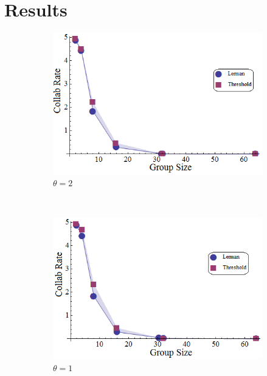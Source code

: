 \documentclass[defaultstyle,12pt]{proposal}
\begin{document}
\section{Results}
\begin{figure}[!htb]
\begin{subfigure}{0.33\textwidth}
\centering\includegraphics[width=1.0\textwidth]{../assets/LermanCollabCompare3.png}
\centering\caption{$\theta=2$}\label{fig:lercol3}
\end{subfigure}~
\begin{subfigure}{0.33\textwidth}
\centering\includegraphics[width=1.0\textwidth]{../assets/LermanCollabCompare2.png}
\centering\caption{$\theta=1$}\label{fig:lercol2}
\end{subfigure}~
\begin{subfigure}{0.33\textwidth}

\end{subfigure}
\end{figure}
\end{document}
